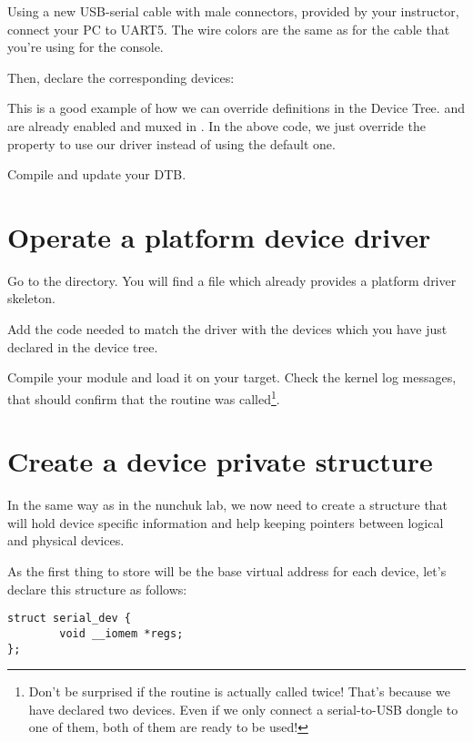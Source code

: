 {\scriptsize {}}

Using a new USB-serial cable with male connectors, provided by your
instructor, connect your PC to UART5. The wire colors are the same
as for the cable that you're using for the console.

Then, declare the corresponding devices:


This is a good example of how we can override definitions in the Device Tree.
 and  are already enabled and muxed in
. In the above code, we
just override the  property to use our driver instead of using
the default one.

Compile and update your DTB.

\section{Operate a platform device driver}

Go to the  directory.
You will find a  file which already provides a platform
driver skeleton.

Add the code needed to match the driver with the devices which you have
just declared in the device tree.

Compile your module and load it on your target. Check the kernel log
messages, that should confirm that the  routine was
called\footnote{Don't be surprised if the  routine is
actually called twice! That's because we have declared two devices.
Even if we only connect a serial-to-USB dongle to one of them, both
of them are ready to be used!}.

\section{Create a device private structure}

In the same way as in the nunchuk lab, we now need to create a
structure that will hold device specific information and help
keeping pointers between logical and physical devices.

As the first thing to store will be the base virtual address for
each device, let's declare this structure as follows:

\begin{verbatim}
struct serial_dev {
        void __iomem *regs;
};
\end{verbatim}

